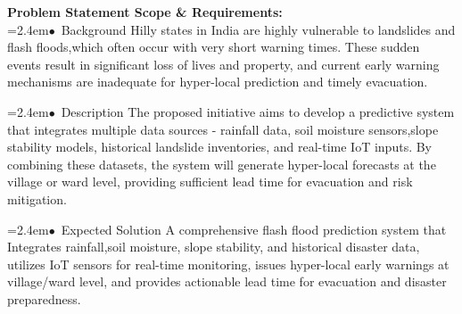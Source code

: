 \documentclass[10pt,a4paper]{article}
\begin{document}
\begin{tcolorbox}[pscard, title={"\textbf{SIH26192} \quad $\vert$ \quad Flash Flood Prediction System for Hilly Regions using Multi-Source Data The...}]
\textbf{\color{sihnavy}Problem Statement Scope \& Requirements:}\\[0.15cm]
\noindent\hspace*{1.2em}\hangindent=2.4em\textcolor{sihblue}{$\bullet$}~\small Background Hilly states in India are highly vulnerable to landslides and flash floods,which often occur with very short warning times. These sudden events result in significant loss of lives and property, and current early warning mechanisms are inadequate for hyper-local prediction and timely evacuation.\par\vspace{0.05cm}
\noindent\hspace*{1.2em}\hangindent=2.4em\textcolor{sihblue}{$\bullet$}~\small Description The proposed initiative aims to develop a predictive system that integrates multiple data sources - rainfall data, soil moisture sensors,slope stability models, historical landslide inventories, and real-time IoT inputs. By combining these datasets, the system will generate hyper-local forecasts at the village or ward level, providing sufficient lead time for evacuation and risk mitigation.\par\vspace{0.05cm}
\noindent\hspace*{1.2em}\hangindent=2.4em\textcolor{sihblue}{$\bullet$}~\small Expected Solution A comprehensive flash flood prediction system that Integrates rainfall,soil moisture, slope stability, and historical disaster data, utilizes IoT sensors for real-time monitoring, issues hyper-local early warnings at village/ward level, and provides actionable lead time for evacuation and disaster preparedness.\par\vspace{0.05cm}

\end{tcolorbox}
\vspace{0.4cm}
{}
\end{document}

